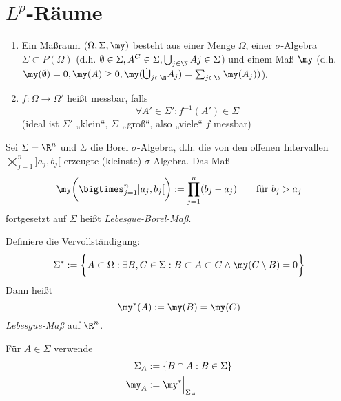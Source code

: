 
\chapter{\texorpdfstring{$L^p$}{Lp}-Räume}


\begin{df} \label{2.1}
	\begin{enumerate}[1)]
		\item
			Ein Maßraum $(\Omega, \Sigma, \my)$ besteht aus einer Menge $\Omega$, einer $\sigma$-Algebra $\Sigma \subset P(\Omega)$ (d.h. $\emptyset \in \Sigma, A^C \in \Sigma, \bigcup_{j\in \N} Aj \in \Sigma$) und einem Maß $\my$ (d.h. $\my(\emptyset) = 0, \my(A) \ge 0, \my(\dot\bigcup_{j\in \N}A_j) = \sum_{j\in \N} \my(A_j))$).
		\item
			$f: \Omega \to \Omega'$ heißt messbar, falls
			\[
				\forall A' \in \Sigma' : f^{-1}(A') \in \Sigma
			\]
			(ideal ist $\Sigma'$ „klein“, $\Sigma$ „groß“, also „viele“ $f$ messbar)
	\end{enumerate}
\end{df}

\begin{ex}[Anwendung]
	Sei $\Sigma = \R^n$ und $\Sigma$ die Borel $\sigma$-Algebra, d.h. die von den offenen Intervallen $\bigtimes_{j=1}^n ]a_j,b_j[$ erzeugte (kleinste) $\sigma$-Algebra.
	Das Maß
	\[
		\my \bigg( \bigtimes_{j=1}^n ]a_j,b_j[ \bigg) := \prod_{j=1}^n (b_j - a_j)
		\qquad \text{für $b_j > a_j$}
	\]
	fortgesetzt auf $\Sigma$ heißt \emph{Lebesgue-Borel-Maß}.

	Definiere die Vervollständigung:
	\[
		\Sigma^* := \bigg\{ A \subset \Omega : \exists B,C \in \Sigma : B \subset A \subset C \land \my(C \setminus B) = 0 \bigg\}
	\]
	Dann heißt
	\[
		\my^*(A) := \my(B) = \my(C)
	\]
	\emph{Lebesgue-Maß} auf $\R^n$.

	Für $A \in \Sigma$ verwende
	\begin{align*}
		\Sigma_A &:= \{ B \cap A : B \in \Sigma \} \\
		\my_A &:= \my^* \Big|_{\Sigma_A}
	\end{align*}
\end{ex}

